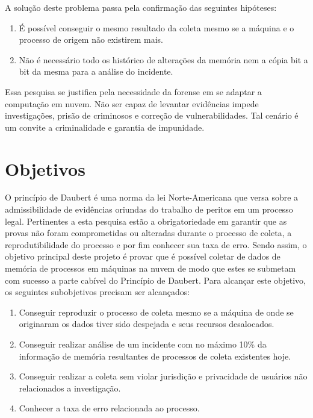 \documentclass[12pt,				%
	openright,			%
	oneside,			%
	a4paper,			%
	english,			%
	brazil				%
	]{abntex2}
\begin{document}
A solução deste problema passa pela confirmação das seguintes hipóteses:

\begin{enumerate}
 \item É possível conseguir o mesmo resultado da coleta mesmo se a máquina e o processo de origem não existirem mais.
 \item Não é necessário todo os histórico de alterações da memória nem a cópia bit a bit da mesma para a análise do incidente.
\end{enumerate}

Essa pesquisa se justifica pela necessidade da forense em se adaptar a computação em nuvem. Não ser capaz de levantar evidências impede investigações, prisão de criminosos e 
correção de vulnerabilidades. Tal cenário é um convite a criminalidade e garantia de impunidade.

\chapter{Objetivos} \label{chap:obj}
O princípio de Daubert é uma norma da lei Norte-Americana que versa sobre a admissibilidade de evidências oriundas do trabalho de peritos em um processo legal. Pertinentes a
esta pesquisa estão a obrigatoriedade em garantir que as provas não foram comprometidas ou alteradas durante o processo de coleta, a reprodutibilidade do processo e
por fim conhecer sua taxa de erro. Sendo assim, o objetivo principal deste projeto é provar que é possível coletar de dados de memória de processos em 
máquinas na nuvem de modo que estes se submetam com sucesso a parte cabível do Princípio de Daubert. Para alcançar este objetivo, os seguintes subobjetivos precisam ser alcançados:

\begin{enumerate}
 \item Conseguir reproduzir o processo de coleta mesmo se a máquina de onde se originaram os dados tiver sido despejada e seus recursos desalocados.
 \item Conseguir realizar análise de um incidente com no máximo 10\% da informação de memória resultantes de processos de coleta existentes hoje.
 \item Conseguir realizar a coleta sem violar jurisdição e privacidade de usuários não relacionados a investigação.
 \item Conhecer a taxa de erro relacionada ao processo.
\end{enumerate}
\end{document}
